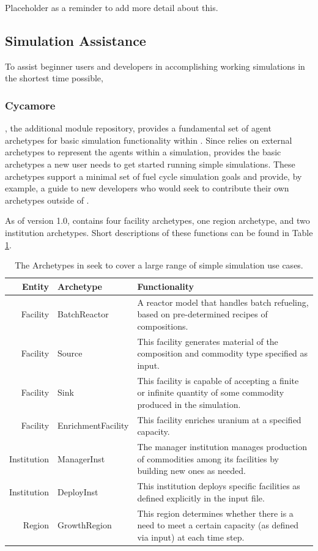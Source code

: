 Placeholder as a reminder to add more detail about this.

\subsection{Simulation Assistance}
To assist beginner users and developers in accomplishing working simulations
in the shortest time possible, 

\subsubsection{Cycamore}

\Cycamore \cite{carlsen_cycamore_2014}, the \Cyclus additional module
repository, provides a fundamental set of agent archetypes for basic simulation 
functionality within \Cyclus.  Since \Cyclus relies on external 
archetypes to represent the agents within a simulation, \Cycamore provides the 
basic archetypes a new user needs to get started running simple simulations.  
These archetypes support a minimal set of fuel cycle simulation goals and 
provide, by example, a guide to new developers who would seek to contribute 
their own archetypes outside of \Cycamore.

As of version 1.0, \Cycamore contains four facility archetypes, one region 
archetype, and two institution archetypes. Short descriptions of these 
functions can be found in Table \ref{tab:cycamore}.


\begin{table}[h]
\centering
\begin{tabularx}{\textwidth}{|r|l|X|}
\hline
\textbf{Entity} & \textbf{Archetype} & \textbf{Functionality} \\
\hline
Facility & BatchReactor & A reactor model that handles batch refueling, based on pre-determined recipes of compositions. \\
Facility & Source & This facility generates material of the composition and commodity type specified as input.  \\
Facility & Sink & This facility is capable of accepting a finite or infinite quantity of some commodity produced in the simulation. \\
Facility & EnrichmentFacility & This facility enriches uranium at a specified capacity. \\
Institution & ManagerInst & The manager institution manages production of commodities among its facilities by building new ones as needed. \\
Institution & DeployInst &  This institution deploys specific facilities as defined explicitly in the input file. \\
Region & GrowthRegion & This region determines whether there is a need to meet a certain capacity (as defined via input) at each time step. \\
\hline
\end{tabularx}
\caption{The Archetypes in \Cycamore seek to cover a large range of simple simulation use cases.}
\label{tab:cycamore}
\end{table}

